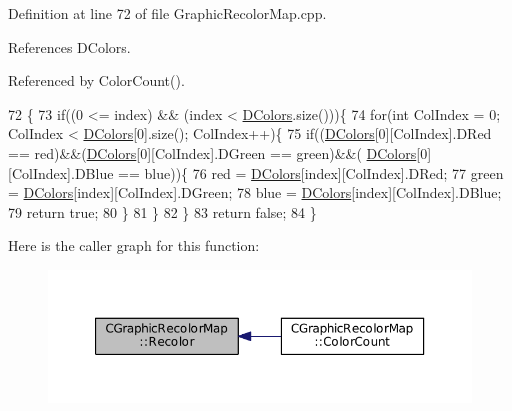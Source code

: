 Definition at line 72 of file Graphic\+Recolor\+Map.\+cpp.



References D\+Colors.



Referenced by Color\+Count().


\begin{DoxyCode}
72                                                                                    \{
73     \textcolor{keywordflow}{if}((0 <= index) && (index < \hyperlink{classCGraphicRecolorMap_a9dea9a9e96e4465a53a40c4a34cebf71}{DColors}.size()))\{
74         \textcolor{keywordflow}{for}(\textcolor{keywordtype}{int} ColIndex = 0; ColIndex < \hyperlink{classCGraphicRecolorMap_a9dea9a9e96e4465a53a40c4a34cebf71}{DColors}[0].size(); ColIndex++)\{
75             \textcolor{keywordflow}{if}((\hyperlink{classCGraphicRecolorMap_a9dea9a9e96e4465a53a40c4a34cebf71}{DColors}[0][ColIndex].DRed == red)&&(\hyperlink{classCGraphicRecolorMap_a9dea9a9e96e4465a53a40c4a34cebf71}{DColors}[0][ColIndex].DGreen == green)&&(
      \hyperlink{classCGraphicRecolorMap_a9dea9a9e96e4465a53a40c4a34cebf71}{DColors}[0][ColIndex].DBlue == blue))\{
76                 red = \hyperlink{classCGraphicRecolorMap_a9dea9a9e96e4465a53a40c4a34cebf71}{DColors}[index][ColIndex].DRed;
77                 green = \hyperlink{classCGraphicRecolorMap_a9dea9a9e96e4465a53a40c4a34cebf71}{DColors}[index][ColIndex].DGreen;
78                 blue = \hyperlink{classCGraphicRecolorMap_a9dea9a9e96e4465a53a40c4a34cebf71}{DColors}[index][ColIndex].DBlue;
79                 \textcolor{keywordflow}{return} \textcolor{keyword}{true};
80             \}
81         \}
82     \}
83     \textcolor{keywordflow}{return} \textcolor{keyword}{false};
84 \}
\end{DoxyCode}
Here is the caller graph for this function\+:\nopagebreak
\begin{figure}[H]
\begin{center}
\leavevmode
\includegraphics[width=350pt]{classCGraphicRecolorMap_a338087373145b89a29902b50276358d1_icgraph}
\end{center}
\end{figure}


